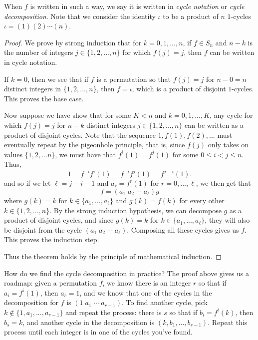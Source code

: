 \documentclass[11pt,dvipsnames]{book}
\numberwithin{figure}{section} %
\numberwithin{table}{section} %
\begin{document}
When $f$ is written in such a way, we say it is written in {\it cycle notation} or {\it cycle decomposition}. Note that we consider the identity $\iota$ to be a product of $n$ $1$-cycles $\iota = (1)(2) \cdots (n)$. 

\begin{proof}
We prove by strong induction that for $k=0,1,...,n$, if $f\in S_n$ and $n-k$ is the number of integers $j\in \{1,2,...,n\}$ for which $f(j)=j$, then $f$ can be written in cycle notation. 

If $k=0$, then we see that if $f$ is a permutation so that $f(j)=j$ for $n-0=n$ distinct integers in $\{1,2,...,n\}$, then $f=\iota$, which is a product of disjoint $1$-cycles. This proves the base case. 

Now suppose we have show that for some $K<n$ and $k=0,1,...,K$, any cycle for which $f(j)=j$ for $n-k$ distinct integers $j\in \{1,2,...,n\}$ can be written as a product of disjoint cycles. Note that the sequence $1,f(1),f(2),...$ must eventually repeat by the pigeonhole principle, that is, since $f(j)$ only takes on values $\{1,2,...n\}$, we must have that $f^i(1)=f^j(1)$ for some $0\leq i<j\leq n$. Thus,
\[
1= f^{-i}f^{i}(1) = f^{-i}f^{j}(1) = f^{j-i}(1).
\]
and so if we let $\ell=j-i-1$ and $a_{r}=f^{r}(1)$ for $r=0,...,\ell$, we then get that 
\[
f=(a_{1}\; a_{2}\;\cdots \; a_{\ell}) g
\]
where $g(k)=k$ for $k\in \{a_{1},...,a_{\ell}\}$ and $g(k)=f(k)$ for every other $k\in \{1,2,...,n\}$. By the strong induction hypothesis, we can decompose $g$ as a product of disjoint cycles, and since $g(k)=k$ for $k\in \{a_{1},...,a_{\ell}\}$, they will also be disjoint from the cycle $(a_{1}\; a_{2}\;\cdots \; a_{\ell})$. Composing all these cycles gives us $f$. This proves the induction step.

Thus the theorem holds by the principle of mathematical induction.
\end{proof}


How do we find the cycle decomposition in practice? The proof above gives us a roadmap: given a permutation $f$, we know there is an integer $r$ so that if $a_{i}= f^{i}(1)$, then $a_{r}=1$, and we know that one of the cycles in the decomposition for $f$ is $(1 \; a_{1}\; \cdots \; a_{r-1})$. To find another cycle, pick $k\not\in \{1,a_{1},...,a_{r-1}\}$ and repeat the process: there is $s$ so that if $b_{i}=f^{i}(k)$, then $b_{s}=k$, and another cycle in the decomposition is $(k,b_{1},...,b_{s-1})$. Repeat this process until each integer is in one of the cycles you've found. 
\end{document}
